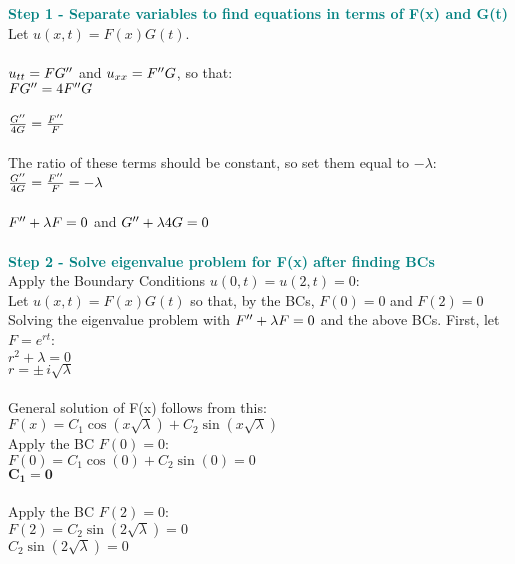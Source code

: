 \documentclass{article}
\begin{document}
\begin{enumerate}
\textcolor{teal}{\textbf{Step 1 - Separate variables to find equations in terms of F(x) and G(t)}}\\
Let $u(x,t) = F(x)G(t)$.\\\\
$u_{tt} = FG\sp{\prime\prime}$ and $u_{xx} = F\sp{\prime\prime}G$, so that:\\
$FG\sp{\prime\prime} = 4F\sp{\prime\prime}G$\\\\
$\frac{G\sp{\prime\prime}}{4G} = \frac{F\sp{\prime\prime}}{F}$\\\\
The ratio of these terms should be constant, so set them equal to $-\lambda$:\\
$\frac{G\sp{\prime\prime}}{4G} = \frac{F\sp{\prime\prime}}{F} = -\lambda$\\\\
$F\sp{\prime\prime} + \lambda F = 0$ and $G\sp{\prime\prime} + \lambda 4G = 0$\\\\
\textcolor{teal}{\textbf{Step 2 - Solve eigenvalue problem for F(x) after finding BCs}}\\
Apply the Boundary Conditions $u(0,t)=u(2,t)=0$:\\
Let $u(x,t)=F(x)G(t)$ so that, by the BCs, $F(0)=0$ and $F(2)=0$\\
Solving the eigenvalue problem with $F\sp{\prime\prime} + \lambda F = 0$ and the above BCs. First, let $F=e^{rt}$:\\
$r^2 + \lambda =0$\\
$r = \pm\,i\sqrt{\lambda}$\\\\
General solution of F(x) follows from this:\\
$F(x)=C_1\cos(x\sqrt{\lambda}) + C_2\sin(x\sqrt{\lambda})$\\
Apply the BC $F(0)=0$:\\
$F(0)=C_1\cos(0) + C_2\sin(0) = 0$\\
$\bm{C_1 = 0}$\\\\
Apply the BC $F(2)=0$:\\
$F(2)=C_2\sin(2\sqrt{\lambda}) = 0$\\
$C_2\sin(2\sqrt{\lambda}) = 0$\\


\end{enumerate}
\end{document}
